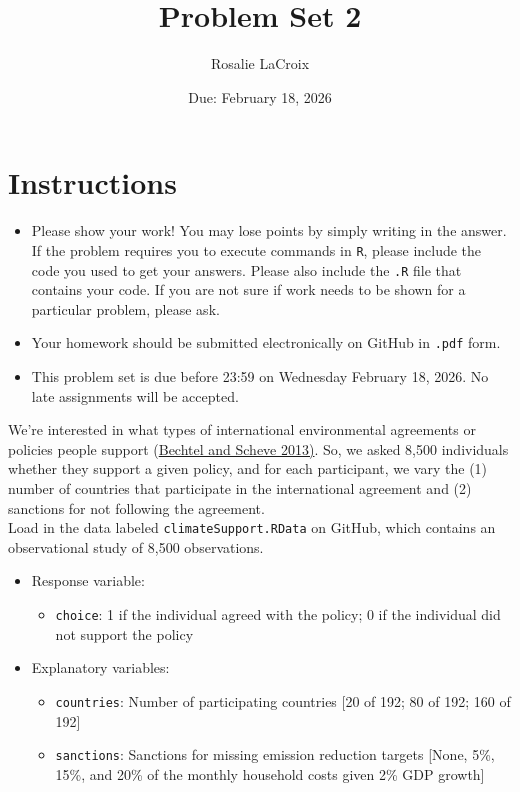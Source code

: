\documentclass[12pt,letterpaper]{article}
\title{Problem Set 2}
\date{Due: February 18, 2026}
\author{Rosalie LaCroix}
\begin{document}
	\maketitle
	\section*{Instructions}
	\begin{itemize}
		\item Please show your work! You may lose points by simply writing in the answer. If the problem requires you to execute commands in \texttt{R}, please include the code you used to get your answers. Please also include the \texttt{.R} file that contains your code. If you are not sure if work needs to be shown for a particular problem, please ask.
		\item Your homework should be submitted electronically on GitHub in \texttt{.pdf} form.
		\item This problem set is due before 23:59 on Wednesday February 18, 2026. No late assignments will be accepted.

	\end{itemize}

	\vspace{.25cm}

\noindent We're interested in what types of international environmental agreements or policies people support (\href{https://www.pnas.org/content/110/34/13763}{Bechtel and Scheve 2013)}. So, we asked 8,500 individuals whether they support a given policy, and for each participant, we vary the (1) number of countries that participate in the international agreement and (2) sanctions for not following the agreement. \\

\noindent Load in the data labeled \texttt{climateSupport.RData} on GitHub, which contains an observational study of 8,500 observations.

\begin{itemize}
	\item
	Response variable: 
	\begin{itemize}
		\item \texttt{choice}: 1 if the individual agreed with the policy; 0 if the individual did not support the policy
	\end{itemize}
	\item
	Explanatory variables: 
	\begin{itemize}
		\item
		\texttt{countries}: Number of participating countries [20 of 192; 80 of 192; 160 of 192]
		\item
		\texttt{sanctions}: Sanctions for missing emission reduction targets [None, 5\%, 15\%, and 20\% of the monthly household costs given 2\% GDP growth]
		
	\end{itemize}
	
\end{itemize}
\end{document}
